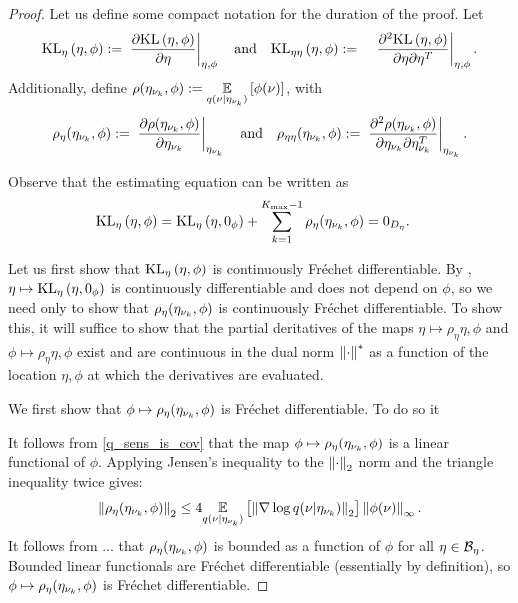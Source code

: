 \begin{thm}
\begin{proof}
Let us define some compact notation for the duration of the proof.
Let
%
\begin{align*}
%
\KLgrad{\eta, \phi} :={}&
    \fracat{\partial \KL{\eta, \phi}}{\partial \eta}{\eta, \phi}
\mathtxt{and}
\KLhess{\eta, \phi} :={}&
    \fracat{\partial^2 \KL{\eta, \phi}}
           {\partial \eta \partial \eta^T}{\eta, \phi}.
%
\end{align*}
%
Additionally, define $\rho(\eta_{\nu_{k}}, \phi) :={} \underset{q(\nu \vert
\eta_{\nu_{k}})}{\mathbb{E}}\left[\phi(\nu)\right]$, with
%
\begin{align*}
%
\rho_\eta(\etanuk, \phi) :={}
\fracat{\partial \rho(\etanuk, \phi)}
       {\partial \etanuk}{\etanuk} \mathand
\rho_{\eta\eta}(\etanuk, \phi) :={}
   \fracat{\partial^2 \rho(\etanuk, \phi)}
          {\partial \etanuk \partial \etanuk^T}{\etanuk}.
%
\end{align*}

Observe that the estimating equation can be written as
%
\begin{align*}
%
%
\KLgrad{\eta, \phi} ={}&
\KLgrad{\eta, \phiz} + \sumkm \rho_\eta(\etanuk, \phi)
= 0_\etadim.
%
\end{align*}

Let us first show that $\mathrm{KL}_{\eta}\left(\eta, \phi\right)$ is continuously Fr{\'e}chet
differentiable.  By , $\eta \mapsto
\mathrm{KL}_{\eta}\left(\eta, 0_\phi\right)$ is continuously differentiable and does not depend on
$\phi$, so we need only to show that $\rho_\eta(\eta_{\nu_{k}}, \phi)$ is continuously
Fr{\'e}chet differentiable. To show this, it will suffice to show that the
partial deritatives of the maps $\eta \mapsto \rho_\eta{\eta, \phi}$ and $\phi
\mapsto \rho_\eta{\eta, \phi}$ exist and are continuous in the dual norm
$\left\Vert\cdot\right\Vert^*$ as a function of the location $\eta, \phi$ at which the
derivatives are evaluated.

We first show that $\phi \mapsto \rho_\eta(\eta_{\nu_{k}}, \phi)$ is Fr{\'e}chet
differentiable.  To do so it


It follows from \eqref{q_sens_is_cov} that the map $\phi \mapsto
\rho_\eta(\eta_{\nu_{k}}, \phi)$ is a linear functional of $\phi$.  Applying Jensen's
inequality to the $\left\Vert\cdot\right\Vert_2$ norm and the triangle inequality twice gives:
%
\begin{align*}
%
\norm{\rho_\eta(\etanuk, \phi)}_2 \le
    4 \expect{\q(\nu \vert \etanuk)}
             {\norm{\nabla \log \q(\nu \vert \etanuk)}_2}
              \norminf{\phi(\nu)}.
%
\end{align*}
%
It follows from ... that $\rho_\eta(\eta_{\nu_{k}},
\phi)$ is bounded as a function of $\phi$ for all $\eta \in \mathcal{B}_\eta$.
Bounded linear functionals are Fr{\'e}chet differentiable (essentially by
definition), so $\phi \mapsto \rho_\eta(\eta_{\nu_{k}}, \phi)$ is Fr{\'e}chet
differentiable.


\end{proof}
\end{thm}
